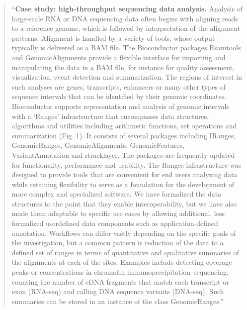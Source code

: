 \documentclass[]{tufte-book}
\begin{document}
\begin{quote}
``\textbf{Case study: high-throughput sequencing data analysis.} Analysis of
large-scale RNA or DNA sequencing data often begins with aligning reads to a
reference genome, which is followed by interpretation of the alignment patterns.
Alignment is handled by a variety of tools, whose output typically is delivered
as a BAM file. The Bioconductor packages Rsamtools and GenomicAlignments provide
a flexible interface for importing and manipulating the data in a BAM file, for
instance for quality assessment, visualization, event detection and
summarization. The regions of interest in such analyses are genes, transcripts,
enhancers or many other types of sequence intervals that can be identified by
their genomic coordinates. Bioconductor supports representation and analysis of
genomic intervals with a `Ranges' infrastructure that encompasses data
structures, algorithms and utilities including arithmetic functions, set
operations and summarization (Fig. 1). It consists of several packages
including IRanges, GenomicRanges, GenomicAlignments, GenomicFeatures,
VariantAnnotation and rtracklayer. The packages are frequently updated for
functionality, performance and usability. The Ranges infrastructure was designed
to provide tools that are convenient for end users analyzing data while
retaining flexibility to serve as a foundation for the development of more
complex and specialized software. We have formalized the data structures to the
point that they enable interoperability, but we have also made them adaptable to
specific use cases by allowing additional, less formalized userdefined data
components such as application-defined annotation. Workflows can differ vastly
depending on the specific goals of the investigation, but a common pattern is
reduction of the data to a defined set of ranges in terms of quantitative and
qualitative summaries of the alignments at each of the sites. Examples include
detecting coverage peaks or concentrations in chromatin
immunoprecipitation--sequencing, counting the number of cDNA fragments that match
each transcript or exon (RNA-seq) and calling DNA sequence variants (DNA-seq).
Such summaries can be stored in an instance of the class GenomicRanges.''
\citep{huber2015orchestrating}
\end{quote}
\end{document}
